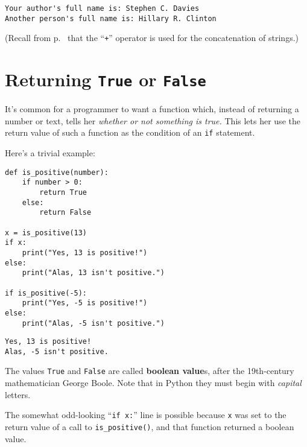 \begin{Verbatim}[fontsize=\small,samepage=true,frame=leftline,framesep=5mm,framerule=1mm]
Your author's full name is: Stephen C. Davies
Another person's full name is: Hillary R. Clinton
\end{Verbatim}

\smallskip

(Recall from p.~\pageref{concatenatingStrings} that the ``\texttt{+}'' operator
is used for the concatenation of strings.)

\bigskip
\bigskip

\section{Returning \texttt{True} or \texttt{False}}

It's common for a programmer to want a function which, instead of returning a
number or text, tells her \textit{whether or not something is true.} This lets
her use the return value of such a function as the condition of an \texttt{if}
statement.

Here's a trivial example:

\begin{Verbatim}[fontsize=\small,samepage=true,frame=single,framesep=3mm]
def is_positive(number):
    if number > 0:
        return True
    else:
        return False

x = is_positive(13)
if x:
    print("Yes, 13 is positive!")
else:
    print("Alas, 13 isn't positive.")

if is_positive(-5):
    print("Yes, -5 is positive!")
else:
    print("Alas, -5 isn't positive.")
\end{Verbatim}
\vspace{-.2in}

\begin{Verbatim}[fontsize=\small,samepage=true,frame=leftline,framesep=5mm,framerule=1mm]
Yes, 13 is positive!
Alas, -5 isn't positive.
\end{Verbatim}

The values \texttt{True} and \texttt{False} are called \textbf{boolean value}s,
after the 19th-century mathematician George Boole. Note that in Python they
must begin with \textit{capital} letters.

The somewhat odd-looking ``\texttt{if x:}'' line is possible because \texttt{x}
was set to the return value of a call to \texttt{is\_positive()}, and that
function returned a boolean value.

